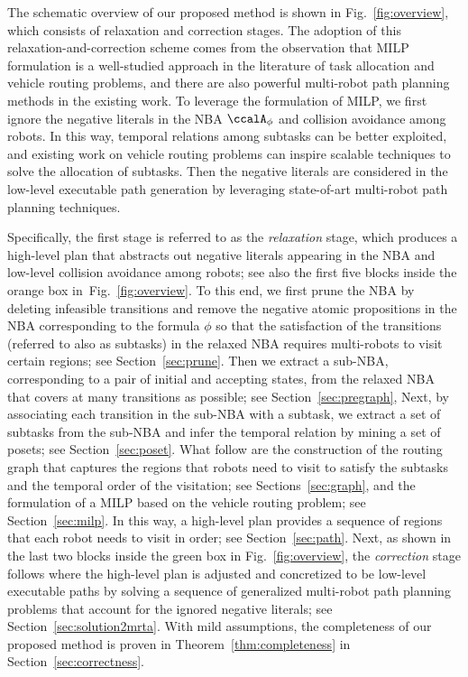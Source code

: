 \documentclass[Afour,sageh,times]{sagej}
\newcommand{\autop}{\ccalA_{\phi}}
\begin{document}
      {The schematic overview of our proposed method is shown in Fig.~\ref{fig:overview}, which consists of relaxation and correction stages.  The adoption of this relaxation-and-correction scheme comes from the observation that MILP formulation is a well-studied approach in the literature of task allocation and vehicle routing problems, and there are also powerful multi-robot path planning methods in the existing work. To leverage the formulation of MILP, we first ignore the negative literals in the NBA $\autop$ and collision avoidance among robots. In this way, temporal relations among subtasks can be better exploited, and existing work on vehicle routing problems can inspire scalable techniques to solve the allocation of subtasks. Then the negative literals are  considered in the low-level executable path generation by leveraging state-of-art multi-robot path planning techniques.

Specifically, the first stage is referred to as the {\it relaxation} stage, which produces a high-level plan that abstracts out negative literals appearing in the NBA and low-level collision avoidance among robots; see also the first five blocks inside the orange box in~Fig.~\ref{fig:overview}. To this end, we first prune the NBA by deleting infeasible transitions and remove the negative atomic propositions in the NBA corresponding to the formula $\phi$ so that the satisfaction of the transitions (referred to also as subtasks) in the relaxed NBA requires multi-robots to visit certain regions; see Section~\ref{sec:prune}. Then we extract a sub-NBA, corresponding to a pair of initial and accepting states, from the relaxed NBA that covers at many transitions as possible; see Section~\ref{sec:pregraph}, Next, by associating each transition in the sub-NBA with a subtask, we extract a set of subtasks from the sub-NBA and infer the temporal relation by mining a set of posets; see Section~\ref{sec:poset}. What follow are the construction of the routing graph that captures the regions that robots need to visit to satisfy the subtasks and the temporal order of the visitation; see Sections~\ref{sec:graph}, and the formulation of a MILP based on the vehicle routing problem; see Section~\ref{sec:milp}. In this way, a high-level plan provides a sequence of regions that each robot needs to visit in order; see Section~\ref{sec:path}. Next, as shown in the last two blocks inside the green box in Fig.~\ref{fig:overview}, the {\it correction} stage follows where the high-level plan is adjusted and concretized to be low-level executable paths by solving a sequence of generalized multi-robot path planning problems that account for the ignored negative literals; see Section~\ref{sec:solution2mrta}. With mild assumptions, the completeness of our proposed method is proven in Theorem~\ref{thm:completeness} in Section~\ref{sec:correctness}.


}
\end{document}
